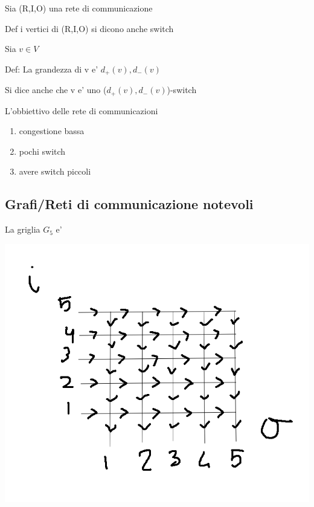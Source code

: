 \documentclass{article}
\begin{document}
        \begin{flushleft}
          Sia (R,I,O) una rete di communicazione 
        \end{flushleft}
        \begin{flushleft}
          Def i vertici di (R,I,O) si dicono anche switch 
        \end{flushleft}
        \begin{flushleft}
          Sia $v\in V$
        \end{flushleft}
        \begin{flushleft}
          Def: La grandezza di v e' $d_+(v),d_-(v)$
        \end{flushleft}
        \begin{flushleft}
          Si dice anche che v e' uno ($d_+(v),d_-(v)$)-switch
        \end{flushleft}
        \begin{flushleft}
          L'obbiettivo delle rete di communicazioni
        \end{flushleft}
        \begin{enumerate}
          \item congestione bassa
          \item pochi switch
          \item avere switch piccoli
        \end{enumerate}
        \subsection*{Grafi/Reti di communicazione notevoli}
        \begin{flushleft}
          La griglia $G_5$ e'
        \end{flushleft}
        \includegraphics[bb=0 0 120 120]{pic/griglia5.png}
\end{document}
